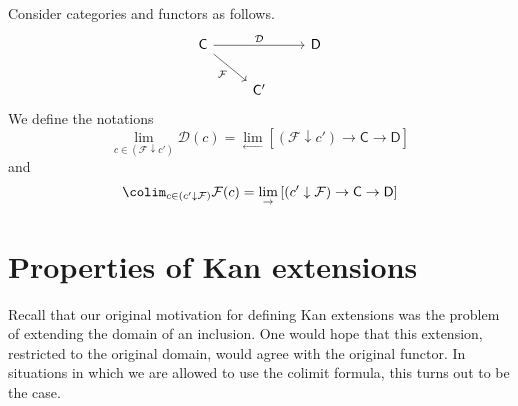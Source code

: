 \documentclass[main.tex]{subfiles}
\begin{document}
\begin{definition}
  \label{def:limit_over_a_comma_category}
  Consider categories and functors as follows.
  \begin{equation*}
    \begin{tikzcd}
      \mathsf{C}
      \arrow[dr, swap, "\mathcal{F}"]
      \arrow[rr, "\mathcal{D}"]
      && \mathsf{D}
      \\
      & \mathsf{C}'
    \end{tikzcd}
  \end{equation*}
  We define the notations
  \begin{equation*}
    \lim_{c \in (\mathcal{F} \downarrow c')} \mathcal{D}(c) = \lim_{\leftarrow} \left[ (\mathcal{F} \downarrow c') \to \mathsf{C} \to \mathsf{D} \right]
  \end{equation*}
  and
  \begin{equation*}
    \colim_{c \in (c' \downarrow \mathcal{F})} \mathcal{F}(c) = \lim_{\rightarrow} \left[ (c' \downarrow \mathcal{F}) \to \mathsf{C} \to \mathsf{D} \right]
  \end{equation*}
\end{definition}

\section{Properties of Kan extensions}
\label{sec:properties_of_kan_extensions}

Recall that our original motivation for defining Kan extensions was the problem of extending the domain of an inclusion. One would hope that this extension, restricted to the original domain, would agree with the original functor. In situations in which we are allowed to use the colimit formula, this turns out to be the case.
\end{document}
